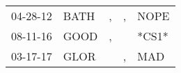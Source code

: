 \begin{supertabular}{p{0.07\textwidth}p{0.06\textwidth}p{0.02\textwidth}p{0.02\textwidth}p{0.06\textwidth}}
 04-28-12\textsuperscript{} &  BATH\textsuperscript{} &  , &  , &  NOPE\textsuperscript{} \\
 08-11-16\textsuperscript{} &  GOOD\textsuperscript{} &  , &    &                   *CS1* \\
 03-17-17\textsuperscript{} &  GLOR\textsuperscript{} &    &  , &   MAD\textsuperscript{} \\
\end{supertabular}
